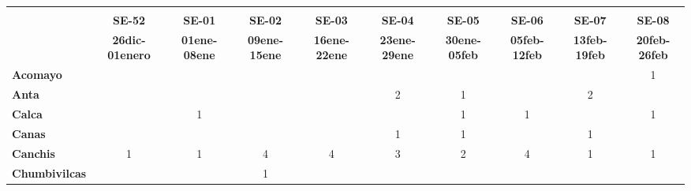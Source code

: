 \begin{tabular}{lccccccccc}
	\textbf{}              & \multicolumn{1}{l}{}                        & \multicolumn{1}{l}{}      & \multicolumn{1}{l}{}                         & \multicolumn{1}{l}{}                         & \multicolumn{1}{l}{}                         & \multicolumn{1}{l}{}                        & \multicolumn{1}{l}{}                         & \multicolumn{1}{l}{}                         & \multicolumn{1}{l}{}     \\
	\textbf{}                                                                               
	&\textbf{SE-52}
	&\textbf{SE-01}								&\textbf{SE-02}				&\textbf{SE-03}
	&\textbf{SE-04}								&\textbf{SE-05}	
	&\textbf{SE-06}								&\textbf{SE-07}				&\textbf{SE-08}\\
	\textbf{}              	  	
	&\textbf{26dic-01enero}						&\textbf{01ene-08ene}			&\textbf{09ene-15ene}						&\textbf{16ene-22ene}						&\textbf{23ene-29ene}						&\textbf{30ene-05feb}
	&\textbf{05feb-12feb}						&\textbf{13feb-19feb}
	&\textbf{20feb-26feb}\\
	\textbf{Acomayo}                        	
	&\cellcolor[HTML]{FCC46C}          			&\cellcolor[HTML]{FCC46C} 					&\cellcolor[HTML]{FCC46C} 	    			&\cellcolor[HTML]{FCC46C}				    &\cellcolor[HTML]{FCC46C}
	&\cellcolor[HTML]{FCC46C}					&\cellcolor[HTML]{FCC46C}
	&\cellcolor[HTML]{FCC46C}					&1\\
	\textbf{Anta}                                                          					
	&\cellcolor[HTML]{FCC46C} 
	&\cellcolor[HTML]{FCC46C}					&\cellcolor[HTML]{FCC46C}
	&\cellcolor[HTML]{FCC46C}					&2 				
	&1
	&\cellcolor[HTML]{FCC46C}					&2
	&\cellcolor[HTML]{FCC46C}\\
	\textbf{Calca}      				       								            
	&\cellcolor[HTML]{FCC46C} 
	&1											&\cellcolor[HTML]{FCC46C}	&\cellcolor[HTML]{FCC46C}					&\cellcolor[HTML]{FCC46C}
	&1 											&1	&\cellcolor[HTML]{FCC46C}			&1\\                										
	\textbf{Canas}                              
	&\cellcolor[HTML]{FCC46C} 					&\cellcolor[HTML]{FCC46C}					&\cellcolor[HTML]{FCC46C} 		
	&\cellcolor[HTML]{FCC46C}					&1
	&1											&\cellcolor[HTML]{FCC46C}
	&1											&\cellcolor[HTML]{FCC46C}\\
	\textbf{Canchis}                             		
	&1
	&1											&4
	&4											&3
	&2											&4
	&1											&1\\
	\textbf{Chumbivilcas}                      			
	&\cellcolor[HTML]{FCC46C}
	&\cellcolor[HTML]{FCC46C}					&1

\end{tabular}
